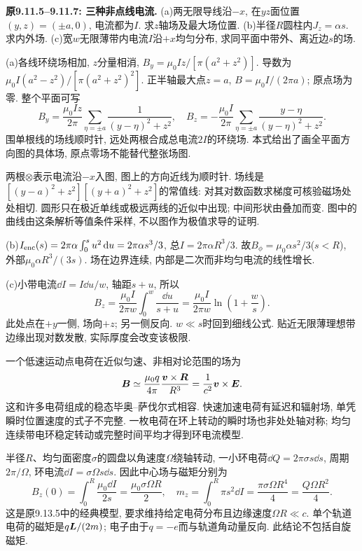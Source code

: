 \label{tb:distributed-current}
\begin{example}
\textbf{原9.11.5--9.11.7: 三种非点线电流.} 
(a)两无限导线沿$-x$, 在$yz$面位置$(y,z)=(\pm a,0)$, 电流都为$I$. 求$z$轴场及最大场位置. (b)半径$R$圆柱内$J_z=\alpha s$. 求内外场. (c)宽$w$无限薄带内电流$I$沿$+x$均匀分布, 求同平面中带外、离近边$s$的场.
\end{example}
\begin{solution}
(a)各线环绕场相加, $z$分量相消, $B_y=\mu_0Iz/[\pi(a^2+z^2)]$. 导数为$\mu_0I(a^2-z^2)/[\pi(a^2+z^2)^2]$. 正半轴最大点$z=a$, $B=\mu_0I/(2\pi a)$; 原点场为零. 整个平面可写
\[B_y=\frac{\mu_0Iz}{2\pi}\sum_{\eta=\pm a}\frac1{(y-\eta)^2+z^2},\quad
B_z=-\frac{\mu_0I}{2\pi}\sum_{\eta=\pm a}\frac{y-\eta}{(y-\eta)^2+z^2}.\]
围单根线的场线顺时针, 远处两根合成总电流$2I$的环绕场. 本式给出了画全平面方向图的具体场, 原点零场不能替代整张场图.


两根$\otimes$表示电流沿$-x$入图, 图上的方向近线为顺时针. 场线是$[(y-a)^2+z^2][(y+a)^2+z^2]$的常值线: 对其对数函数求梯度可核验磁场处处相切. 圆形只在极近单线或极远两线的近似中出现; 中间形状由叠加而变. 图中的曲线由这条解析等值条件采样, 不以图作为极值求导的证明.

(b)$I_{\rm enc}(s)=2\pi\alpha\int_0^su^2\,\mathrm d u=2\pi\alpha s^3/3$, 总$I=2\pi\alpha R^3/3$. 故$B_\phi=\mu_0\alpha s^2/3$($s<R$), 外部$\mu_0\alpha R^3/(3s)$. 场在边界连续, 内部是二次而非均匀电流的线性增长.

(c)小带电流$\dd I=I\dd u/w$, 轴距$s+u$, 所以
\[B_z=\frac{\mu_0I}{2\pi w}\int_0^w\frac{\dd u}{s+u}=\frac{\mu_0I}{2\pi w}\ln\left(1+\frac ws\right).\]
此处点在$+y$一侧, 场向$+z$; 另一侧反向. $w\ll s$时回到细线公式. 贴近无限薄理想带边缘出现对数发散, 实际厚度会改变该极限.
\end{solution}

一个低速运动点电荷在近似匀速、非相对论范围的场为
\[\boldsymbol{B}\simeq\frac{\mu_0q}{4\pi}\frac{\boldsymbol{v}\times\boldsymbol{R}}{R^3}=\frac1{c^2}\boldsymbol{v}\times\boldsymbol{E}.\]
这和许多电荷组成的稳态毕奥--萨伐尔式相容. 快速加速电荷有延迟和辐射场, 单凭瞬时位置速度的式子不完整. 一枚电荷在环上转动的瞬时场也非处处轴对称; 均匀连续带电环稳定转动或完整时间平均才得到环电流模型.

半径$R$、均匀面密度$\sigma$的圆盘以角速度$\Omega$绕轴转动, 一小环电荷$\dd Q=2\pi\sigma s\dd s$, 周期$2\pi/\Omega$, 环电流$\dd I=\sigma\Omega s\dd s$. 因此中心场与磁矩分别为
\[B_z(0)=\int_0^R\frac{\mu_0\dd I}{2s}=\frac{\mu_0\sigma\Omega R}2,\quad
m_z=\int_0^R\pi s^2\dd I=\frac{\pi\sigma\Omega R^4}4=\frac{Q\Omega R^2}4.\]
这是原9.13.5中的经典模型, 要求维持给定电荷分布且边缘速度$\Omega R\ll c$. 单个轨道电荷的磁矩是$q\boldsymbol{L}/(2m)$; 电子由于$q=-e$而与轨道角动量反向. 此结论不包括自旋磁矩.

